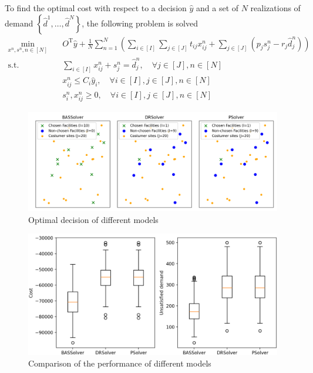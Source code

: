 \documentclass[12pt, letterpaper]{article}
\newcommand{\T}{\mathrm{T}}
\begin{document}
	To find the optimal cost with respect to a decision $\hat{y}$ and a set of $N$ realizations of demand $\left\{\hat{d}^1, \dots, \hat{d}^N\right\}$, the following problem is solved
	\begin{subequations}
		\begin{align}
			\min_{x^n, s^n, n \in [N]} &\quad O^\T\hat{y} + \frac{1}{N}\sum_{n = 1}^{N} \left(\sum_{i \in [I]} \sum_{j \in [J]} t_{ij}x_{ij}^n + \sum_{j \in [J]}(p_j s_{j}^n - r_j \hat{d}_j^n)\right) \\
			\text{s.t.} &\quad \sum_{i \in [I]} x_{ij}^n + s_j^n = \hat{d}_j^n, \quad \forall j \in [J], n \in [N] \\
			&\quad x_{ij}^n \le C_i \hat{y}_i, \quad \forall i \in [I], j \in [J], n \in [N] \\
			&\quad s_i^n, x_{ij}^n \ge 0, \quad \forall i \in [I], j \in [J], n \in [N]
		\end{align}
	\end{subequations}
	

	\begin{figure}[h!]
		\includegraphics[width=\textwidth]{../figure/chosen_facility_costumer_site_pos.png}
		\caption{Optimal decision of different models}
		\label{fig:decisions}		
	\end{figure}

	\begin{figure}[h!]
		\includegraphics[width=\textwidth]{../figure/comparision.png}
		\caption{Comparison of the performance of different models}
			\label{fig:comparison}		
		\end{figure}
\end{document}
